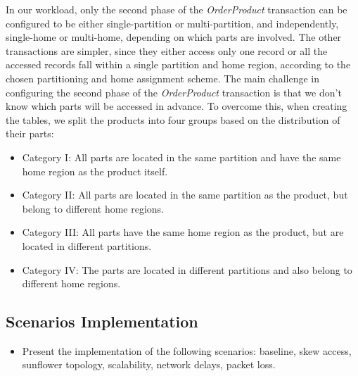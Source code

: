In our workload, only the second phase of the \textit{OrderProduct} transaction can be configured to be either single-partition or multi-partition, and independently, single-home or multi-home, depending on which parts are involved. The other transactions are simpler, since they either access only one record or all the accessed records fall within a single partition and home region, according to the chosen partitioning and home assignment scheme. The main challenge in configuring the second phase of the \textit{OrderProduct} transaction is that we don't know which parts will be accessed in advance. To overcome this, when creating the tables, we split the products into four groups based on the distribution of their parts:
\begin{itemize}
    \item Category I: All parts are located in the same partition and have the same home region as the product itself.
    \item Category II: All parts are located in the same partition as the product, but belong to different home regions.
    \item Category III: All parts have the same home region as the product, but are located in different partitions.
    \item Category IV: The parts are located in different partitions and also belong to different home regions.
\end{itemize}

\subsection{Scenarios Implementation}
\begin{itemize}
    \item Present the implementation of the following scenarios: baseline, skew access, sunflower topology, scalability, network delays, packet loss.
\end{itemize}